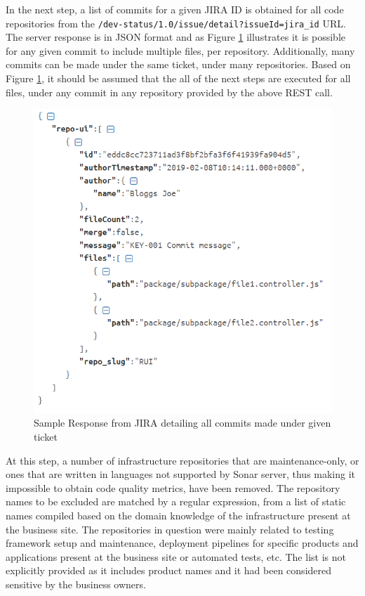 In the next step, a list of commits for a given JIRA ID is obtained for all code repositories from the \texttt{/dev-status/1.0/issue/detail?issueId={jira_id}} URL. The server response is in JSON format and as Figure \ref{fig:source-code:jira:commit-response} illustrates it is possible for any given commit to include multiple files, per repository. Additionally, many commits can be made under the same ticket, under many repositories. Based on Figure \ref{fig:source-code:jira:commit-response}, it should be assumed that the all of the next steps are executed for all files, under any commit in any repository provided by the above REST call.
\begin{figure}[!h]
    \centering
    \includegraphics[scale=0.7]{Figures/gatherer/jira_connector_getting_commit_files_response.PNG}
    \caption{Sample Response from JIRA detailing all commits made under given ticket}
    \label{fig:source-code:jira:commit-response}
    
\end{figure}
    
At this step, a number of infrastructure repositories that are maintenance-only, or ones that are written in languages not supported by Sonar server, thus making it impossible to obtain code quality metrics, have been removed. The repository names to be excluded are matched by a regular expression, from a list of static names compiled based on the domain knowledge of the infrastructure present at the business site. The repositories in question were mainly related to testing framework setup and maintenance, deployment pipelines for specific products and applications present at the business site or automated tests, etc. The list is not explicitly provided as it includes product names and it had been considered sensitive by the business owners.
    
